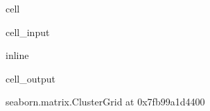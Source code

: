 \documentclass[letterpaper,table,10pt,english]{jupyterBook}
\begin{document}
\begin{sphinxuseclass}{cell}\begin{sphinxVerbatimInput}

\begin{sphinxuseclass}{cell_input}
\begin{sphinxVerbatim}[commandchars=\\\{\}]
 inline
  
\end{sphinxVerbatim}

\end{sphinxuseclass}\end{sphinxVerbatimInput}
\begin{sphinxVerbatimOutput}

\begin{sphinxuseclass}{cell_output}
\begin{sphinxVerbatim}[commandchars=\\\{\}]
\PYGZlt{}seaborn.matrix.ClusterGrid at 0x7fb99a1d4400\PYGZgt{}
\end{sphinxVerbatim}

\noindent{}

\end{sphinxuseclass}\end{sphinxVerbatimOutput}

\end{sphinxuseclass}
\sphinxstepscope
\end{document}
